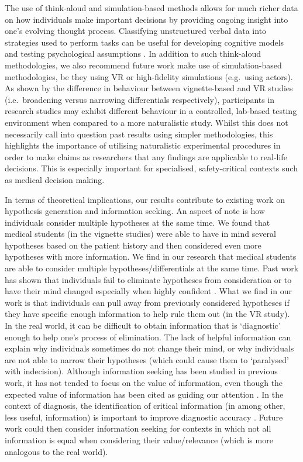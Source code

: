 \documentclass[a4paper, nobind]{templates/ociamthesis}
\begin{document}
The use of think-aloud and simulation-based methods allows for much richer data on how individuals make important decisions by providing ongoing insight into one's evolving thought process. Classifying unstructured verbal data into strategies used to perform tasks can be useful for developing cognitive models and testing psychological assumptions \autocite{ostrovsky_verbal_2024}. In addition to such think-aloud methodologies, we also recommend future work make use of simulation-based methodologies, be they using VR or high-fidelity simulations (e.g.~using actors). As shown by the difference in behaviour between vignette-based and VR studies (i.e.~broadening versus narrowing differentials respectively), participants in research studies may exhibit different behaviour in a controlled, lab-based testing environment when compared to a more naturalistic study. Whilst this does not necessarily call into question past results using simpler methodologies, this highlights the importance of utilising naturalistic experimental procedures in order to make claims as researchers that any findings are applicable to real-life decisions. This is especially important for specialised, safety-critical contexts such as medical decision making.

In terms of theoretical implications, our results contribute to existing work on hypothesis generation and information seeking. An aspect of note is how individuals consider multiple hypotheses at the same time. We found that medical students (in the vignette studies) were able to have in mind several hypotheses based on the patient history and then considered even more hypotheses with more information. We find in our research that medical students are able to consider multiple hypotheses/differentials at the same time. Past work has shown that individuals fail to eliminate hypotheses from consideration \autocite{wason_failure_1960} or to have their mind changed \autocite{akaishi_autonomous_2014} especially when highly confident \autocite{rollwage_confidence_2020,pescetelli_confidence_2021}. What we find in our work is that individuals can pull away from previously considered hypotheses if they have specific enough information to help rule them out (in the VR study). In the real world, it can be difficult to obtain information that is `diagnostic' enough to help one's process of elimination. The lack of helpful information can explain why individuals sometimes do not change their mind, or why individuals are not able to narrow their hypotheses (which could cause them to `paralysed' with indecision). Although information seeking has been studied in previous work, it has not tended to focus on the value of information, even though the expected value of information has been cited as guiding our attention \autocite{manohar_attention_2013}. In the context of diagnosis, the identification of critical information (in among other, less useful, information) is important to improve diagnostic accuracy \autocite{kostopoulou_predictors_2008}. Future work could then consider information seeking for contexts in which not all information is equal when considering their value/relevance (which is more analogous to the real world).
\end{document}
